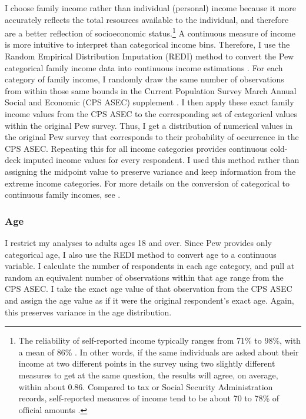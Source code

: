 \documentclass[11pt]{article}
\begin{document}
I choose family income rather than individual (personal) income because it
more accurately reflects the total resources available to the individual, and
therefore are a better reflection of socioeconomic status.\footnote
  {The reliability of self-reported income typically ranges from 71\% to 98\%,
  with a mean of 86\% \citep{Marquis1986}. In other words, if the same
  individuals are asked about their income at two different points in the survey
  using two slightly different measures to get at the same question, the results
  will agree, on average, within about 0.86. Compared to tax or Social Security
  Administration records, self-reported measures of income tend to be about 70
  to 78\% of official amounts \citep{Coder1996, Reardon2011a}.}
A continuous measure of income is more intuitive to interpret than categorical
income bins. Therefore, I use the Random Empirical Distribution Imputation
(REDI) method to convert the Pew categorical family income data into continuous income
estimations \citep{REDI2020}. For each category of family income, I randomly draw the
same number of observations from within those same bounds in the Current
Population Survey March Annual Social and Economic (CPS ASEC) supplement
\citep{ASEC2018}. I then apply these exact family income values
from the CPS ASEC to the corresponding set of categorical values within the
original Pew survey. Thus, I get a distribution of numerical values in the
original Pew survey that corresponds to their probability of occurrence in the
CPS ASEC. Repeating this for all income categories provides continuous cold-deck
imputed income values for every respondent. I used this method rather than
assigning the midpoint value to preserve variance and keep information from the
extreme income categories. For more details on the conversion of categorical to
continuous family incomes, see \citet{REDI2020}.

\hypertarget{age}{%
\subsubsection{Age}\label{sec:age}}

I restrict my analyses to adults ages 18 and over. Since Pew provides only categorical age, I also use the REDI method \citep{REDI2020} to convert age to a continuous variable.
I calculate the number of respondents in each
age category, and pull at random an equivalent number of observations within that
age range from the CPS ASEC. I take the exact age value of that observation from
the CPS ASEC and assign the age value as if it were the original respondent's
exact age. Again, this preserves variance in the age distribution.
\end{document}
